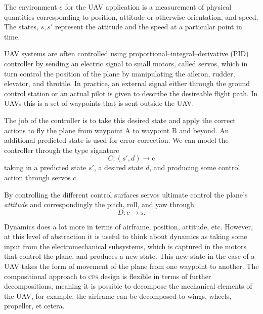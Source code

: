 \documentclass{article}
\begin{document}
The environment \(e\) for the UAV application is a measurement
of physical quantities corresponding to position, attitude
or otherwise orientation, and speed.
The states, \(s, s'\) represent the attitude
and the speed at a particular point in time.

UAV systems are often controlled
using proportional--integral--derivative (PID) controller
by sending an electric signal to small motors, called servos,
which in turn control the position of the plane
by manipulating the aileron, rudder, elevator, and throttle.
In practice, an external signal
either through the ground control station
or an actual pilot is given to describe the desireable flight path.
In UAVs this is a set of waypoints that is sent outside the UAV.

The job of the controller is to take this desired state
and apply the correct actions to fly the plane from waypoint A
to waypoint B and beyond. An additional predicted state is used for error correction.
We can model the controller
through the type signature \[{C}: (s', d) \rightarrow \text{c}\] taking
in a predicted state $s'$, a desired state $d$,
and producing some control action through servos $c$.

By controlling the different control surfaces servos ultimate control the plane's \emph{attitude}
and correspondingly the pitch, roll, and yaw through \[{D}: c \rightarrow \text{s.}\]

Dynamics does a lot more in terms of airframe, position, attitude, etc.
However, at this level of abstraction it is useful
to think about dynamics as taking some input
from the electromechanical subsystems,
which is captured in the motors that control the plane,
and produces a new state.
This new state in the case of a UAV takes the form
of movement of the plane from one waypoint to another.
The compositional approach to \textsc{cps} design is flexible
in terms of further decompositions, meaning it is possible
to decompose the mechanical elements of the UAV,
for example, the airframe can be decomposed to wings, wheels, propeller, et cetera.




\end{document}

